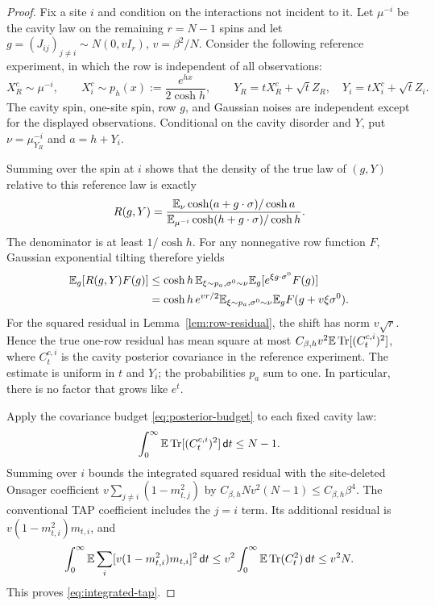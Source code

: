 \documentclass[11pt,reqno]{amsart}
\def\de{{\mathsf{d}}}
\newcommand{\Tr}{\operatorname{Tr}}
\begin{document}
\begin{proof}
Fix a site $i$ and condition on the interactions not incident to it.
Let $\mu^{-i}$ be the cavity law on the remaining $r=N-1$ spins and let
$g=(J_{ij})_{j\ne i}\sim N(0,vI_r)$, $v=\beta^2/N$.
Consider the following reference experiment, in which the row is independent
of all observations:
\[
 X_R^c\sim\mu^{-i},\qquad
 X_i^c\sim p_h(x):=\frac{e^{hx}}{2\cosh h},\qquad
 Y_R=tX_R^c+\sqrt t Z_R,
 \quad Y_i=tX_i^c+\sqrt t Z_i.
\]
The cavity spin, one-site spin, row $g$, and Gaussian noises are independent
except for the displayed observations. Conditional on the cavity disorder
and $Y$, put $\nu=\mu^{-i}_{Y_R}$ and $a=h+Y_i$.

Summing over the spin at $i$ shows that the density of the true law of
$(g,Y)$ relative to this reference law is exactly
\begin{equation*}
 R(g,Y)=
 \frac{{\mathbb{E}}_\nu\cosh(a+g\cdot\sigma)/\cosh a}
      {{\mathbb{E}}_{\mu^{-i}}\cosh(h+g\cdot\sigma)/\cosh h}.
\end{equation*}
The denominator is at least $1/\cosh h$. For any nonnegative row function
$F$, Gaussian exponential tilting therefore yields
\begin{align*}
 {\mathbb{E}}_g[R(g,Y)F(g)]
 &\le \cosh h\,
     {\mathbb{E}}_{\xi\sim p_a,\sigma^0\sim\nu}
             {\mathbb{E}}_g[e^{\xi g\cdot\sigma^0}F(g)]\\
 &=\cosh h\,e^{vr/2}
     {\mathbb{E}}_{\xi\sim p_a,\sigma^0\sim\nu}
             {\mathbb{E}}_gF(g+v\xi\sigma^0).
\end{align*}
For the squared residual in Lemma~\ref{lem:row-residual}, the shift has
norm $v\sqrt r$. Hence the true one-row residual has mean square at most
$C_{\beta,h}v^2\bbE\Tr[(C_t^{c,i})^2]$, where $C_t^{c,i}$ is the cavity
posterior covariance in the reference experiment. The estimate is uniform
in $t$ and $Y_i$; the probabilities $p_a$ sum to one. In particular,
there is no factor that grows like $e^t$.

Apply the covariance budget \eqref{eq:posterior-budget} to each fixed
cavity law:
\[
 \int_0^\infty\bbE\Tr[(C_t^{c,i})^2]\,\de t\le N-1.
\]
Summing over $i$ bounds the integrated squared residual with the
site-deleted Onsager coefficient
$v\sum_{j\ne i}(1-m_{t,j}^2)$ by
$C_{\beta,h}Nv^2(N-1)\le C_{\beta,h}\beta^4$.
The conventional TAP coefficient includes the $j=i$ term. Its additional
residual is $v(1-m_{t,i}^2)m_{t,i}$, and
\[
 \int_0^\infty\bbE\sum_i[v(1-m_{t,i}^2)m_{t,i}]^2\,\de t
 \le v^2\int_0^\infty\bbE\Tr(C_t^2)\,\de t\le v^2N.
\]
This proves \eqref{eq:integrated-tap}.
\end{proof}
\end{document}
